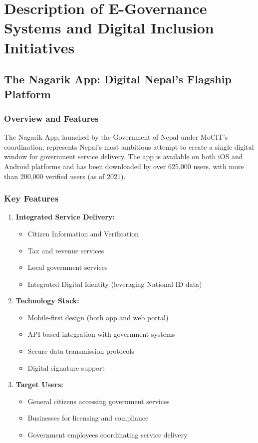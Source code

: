\documentclass[12pt,a4paper]{article}
\begin{document}
\section{Description of E-Governance Systems and Digital Inclusion Initiatives}

\subsection{The Nagarik App: Digital Nepal's Flagship Platform}

\subsubsection{Overview and Features}

The Nagarik App, launched by the Government of Nepal under MoCIT's coordination, represents Nepal's most ambitious attempt to create a single digital window for government service delivery. The app is available on both iOS and Android platforms and has been downloaded by over 625,000 users, with more than 200,000 verified users (as of 2021).

\subsubsection{Key Features}

\begin{enumerate}
    \item \textbf{Integrated Service Delivery:}
    \begin{itemize}
        \item Citizen Information and Verification
        \item Tax and revenue services
        \item Local government services
        \item Integrated Digital Identity (leveraging National ID data)
    \end{itemize}
    
    \item \textbf{Technology Stack:}
    \begin{itemize}
        \item Mobile-first design (both app and web portal)
        \item API-based integration with government systems
        \item Secure data transmission protocols
        \item Digital signature support
    \end{itemize}
    
    \item \textbf{Target Users:}
    \begin{itemize}
        \item General citizens accessing government services
        \item Businesses for licensing and compliance
        \item Government employees coordinating service delivery
    \end{itemize}
\end{enumerate}
\end{document}
